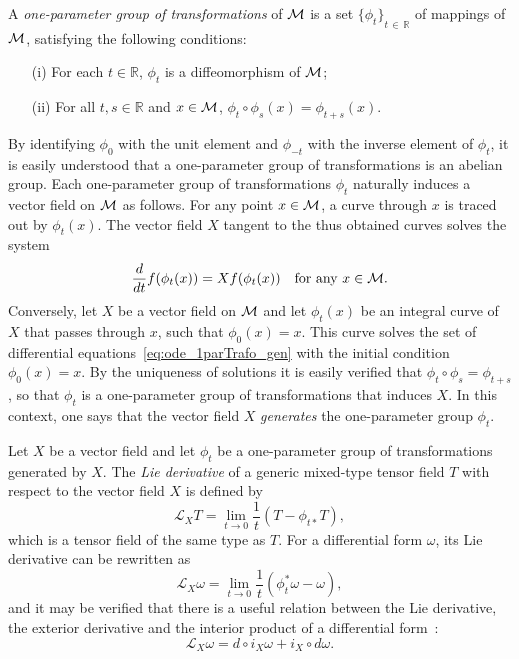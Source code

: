 \documentclass[
final,
11pt,
a4paper,
DIV=11,
headinclude=true,
footinclude=false,
bibliography=totoc,
twoside=true,  %
BCOR=5mm
]{scrbook}
\begin{document}
\begin{definition}
A \emph{one-parameter group of transformations} of $\mathcal{M}$ is 
a set ${\{\phi_t\}}_{t\,\in\,\mathds{R}}$ of mappings of 
$\mathcal{M}$, satisfying the following conditions:
\begin{itemize}
  \item[(i)] For each $t \in \mathds{R}$, $\phi_t$ is a 
    diffeomorphism of $\mathcal{M}$;
  \item[(ii)] For all $t,s \in \mathds{R}$ and $x \in \mathcal{M}$, 
    $\phi_t \circ \phi_s(x) = \phi_{t+s}(x)$.
\end{itemize}
\end{definition}
By identifying $\phi_0$ with the unit element and $\phi_{-t}$ 
with the inverse element of $\phi_t$, it is easily understood 
that a one-parameter group of transformations is an abelian 
group. Each one-parameter group of transformations $\phi_t$ 
naturally induces a vector field on $\mathcal{M}$ as follows. For any 
point $x \in \mathcal{M}$, a curve through $x$ is traced out by 
$\phi_t(x)$.  The vector field $X$ tangent to the thus obtained 
curves solves the system
\begin{equation}
  \label{eq:ode_1parTrafo_gen}
  \frac{d}{dt}f(\phi_t(x)) = Xf(\phi_t(x))
  \quad\text{for any}~x \in \mathcal{M}.
\end{equation}
Conversely, let $X$ be a vector field on $\mathcal{M}$ and let 
$\phi_t(x)$ be an integral curve of $X$ that passes through $x$, 
such that $\phi_0(x) = x$. This curve solves  the set of 
differential equations~\eqref{eq:ode_1parTrafo_gen} with the 
initial condition $\phi_0(x) = x$. By the uniqueness of solutions 
it is easily verified that $\phi_t \circ \phi_s = \phi_{t+s}$, so 
that $\phi_t$ is a one-parameter group of transformations that 
induces $X$. In this context, one says that the vector field $X$ 
\emph{generates} the one-parameter group $\phi_t$.

Let $X$ be a vector field and let $\phi_t$ be a one-parameter 
group of transformations generated by $X$. The \emph{Lie 
  derivative} of a generic mixed-type tensor field $T$ with 
respect to the vector field $X$ is defined by
\begin{equation*}
  \mathscr{L}_X T = \lim_{t \to 0} \frac{1}{t}(T - \phi_{t*} T),
\end{equation*}
which is a tensor field of the same type as $T$.
For a differential form $\omega$, its Lie derivative can be 
rewritten as
\begin{equation*}
  \mathscr{L}_X \omega = \lim_{t \to 0} 
  \frac{1}{t}(\phi^*_t\omega - \omega),
\end{equation*}
and it may be verified that there is a useful relation between 
the Lie derivative, the exterior derivative and the interior 
product of a differential form~\cite{kob1996found}:
\begin{equation}
\label{eq:LieExtInt}
  \mathscr{L}_X \omega = d \circ i_X \omega + i_X \circ d \omega.
\end{equation}
\end{document}
